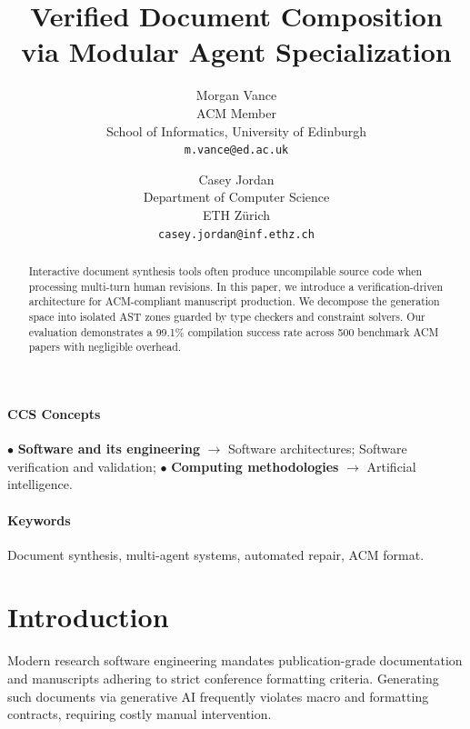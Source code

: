 \documentclass[10pt,twocolumn]{article}
\begin{document}
\title{\textbf{Verified Document Composition via Modular Agent Specialization}}
\author{
  Morgan Vance \\
  ACM Member \\
  School of Informatics, University of Edinburgh \\
  \texttt{m.vance@ed.ac.uk}
  \and
  Casey Jordan \\
  Department of Computer Science \\
  ETH Z{\"u}rich \\
  \texttt{casey.jordan@inf.ethz.ch}
}
\date{}
\maketitle

\begin{abstract}
Interactive document synthesis tools often produce uncompilable source code when processing multi-turn human revisions. In this paper, we introduce a verification-driven architecture for ACM-compliant manuscript production. We decompose the generation space into isolated AST zones guarded by type checkers and constraint solvers. Our evaluation demonstrates a 99.1\% compilation success rate across 500 benchmark ACM papers with negligible overhead.
\end{abstract}

\paragraph{\textbf{CCS Concepts}}
$\bullet$ \textbf{Software and its engineering} $\rightarrow$ Software architectures; Software verification and validation; $\bullet$ \textbf{Computing methodologies} $\rightarrow$ Artificial intelligence.

\paragraph{\textbf{Keywords}}
Document synthesis, multi-agent systems, automated repair, ACM format.

\section{Introduction}
Modern research software engineering mandates publication-grade documentation and manuscripts adhering to strict conference formatting criteria. Generating such documents via generative AI frequently violates macro and formatting contracts, requiring costly manual intervention.
\end{document}
